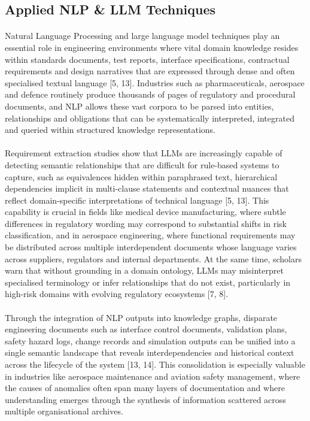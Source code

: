     \subsection{Applied NLP \& LLM Techniques}

        \paragraph{}
        Natural Language Processing and large language model techniques play an essential role in engineering environments where vital domain knowledge resides within standards documents, test reports, interface specifications, contractual requirements and design narratives that are expressed through dense and often specialised textual language [5, 13]. Industries such as pharmaceuticals, aerospace and defence routinely produce thousands of pages of regulatory and procedural documents, and NLP allows these vast corpora to be parsed into entities, relationships and obligations that can be systematically interpreted, integrated and queried within structured knowledge representations.

        \paragraph{}
        Requirement extraction studies show that LLMs are increasingly capable of detecting semantic relationships that are difficult for rule-based systems to capture, such as equivalences hidden within paraphrased text, hierarchical dependencies implicit in multi-clause statements and contextual nuances that reflect domain-specific interpretations of technical language [5, 13]. This capability is crucial in fields like medical device manufacturing, where subtle differences in regulatory wording may correspond to substantial shifts in risk classification, and in aerospace engineering, where functional requirements may be distributed across multiple interdependent documents whose language varies across suppliers, regulators and internal departments. At the same time, scholars warn that without grounding in a domain ontology, LLMs may misinterpret specialised terminology or infer relationships that do not exist, particularly in high-risk domains with evolving regulatory ecosystems [7, 8].

        \newpage
        \paragraph{}
        Through the integration of NLP outputs into knowledge graphs, disparate engineering documents such as interface control documents, validation plans, safety hazard logs, change records and simulation outputs can be unified into a single semantic landscape that reveals interdependencies and historical context across the lifecycle of the system [13, 14]. This consolidation is especially valuable in industries like aerospace maintenance and aviation safety management, where the causes of anomalies often span many layers of documentation and where understanding emerges through the synthesis of information scattered across multiple organisational archives.

